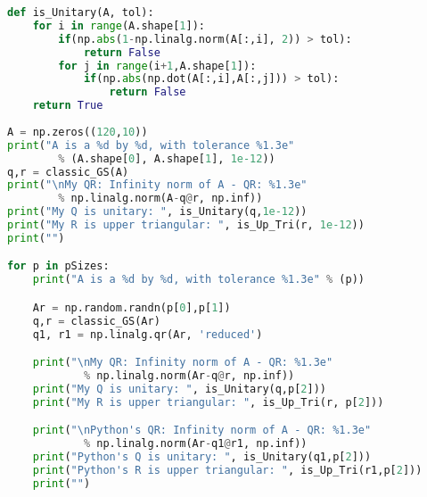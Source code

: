 \documentclass{article}
\begin{document}
\begin{large}
\begin{lstlisting}[language=python]
def is_Unitary(A, tol):
	for i in range(A.shape[1]):
		if(np.abs(1-np.linalg.norm(A[:,i], 2)) > tol):
			return False
		for j in range(i+1,A.shape[1]):
			if(np.abs(np.dot(A[:,i],A[:,j])) > tol):
			  	return False
	return True
	
A = np.zeros((120,10))
print("A is a %d by %d, with tolerance %1.3e" 
		% (A.shape[0], A.shape[1], 1e-12))
q,r = classic_GS(A)
print("\nMy QR: Infinity norm of A - QR: %1.3e" 
		% np.linalg.norm(A-q@r, np.inf))
print("My Q is unitary: ", is_Unitary(q,1e-12))
print("My R is upper triangular: ", is_Up_Tri(r, 1e-12))
print("")

for p in pSizes:
	print("A is a %d by %d, with tolerance %1.3e" % (p))

	Ar = np.random.randn(p[0],p[1])
	q,r = classic_GS(Ar)
	q1, r1 = np.linalg.qr(Ar, 'reduced')

	print("\nMy QR: Infinity norm of A - QR: %1.3e" 
			% np.linalg.norm(Ar-q@r, np.inf))
	print("My Q is unitary: ", is_Unitary(q,p[2]))
	print("My R is upper triangular: ", is_Up_Tri(r, p[2]))

	print("\nPython's QR: Infinity norm of A - QR: %1.3e" 
			% np.linalg.norm(Ar-q1@r1, np.inf))
	print("Python's Q is unitary: ", is_Unitary(q1,p[2]))
	print("Python's R is upper triangular: ", is_Up_Tri(r1,p[2]))
	print("")
\end{lstlisting}
\noindent\makebox[\linewidth]{\rule{\paperwidth}{0.4pt}}
	
	\end{large}
\end{document}
